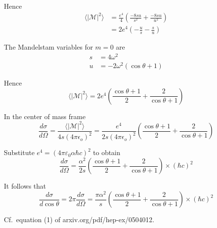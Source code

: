 Hence
\begin{align*}
\langle|\mathcal{M}|^2\rangle
&=\frac{e^4}{4}
\left(\frac{-8su}{s^2}+\frac{-8su}{u^2}\right)
\\
&=2e^4
\left(-\frac{u}{s}-\frac{s}{u}\right)
\end{align*}

The Mandelstam variables for $m=0$ are
\begin{align*}
s&=4\omega^2
\\
u&=-2\omega^2(\cos\theta+1)
\end{align*}

Hence
\begin{equation*}
\langle|\mathcal{M}|^2\rangle
=2e^4\left(
\frac{\cos\theta+1}{2}+\frac{2}{\cos\theta+1}
\right)
\end{equation*}

In the center of mass frame
\begin{equation*}
\frac{d\sigma}{d\Omega}=\frac{\langle|\mathcal{M}|^2\rangle}{4s(4\pi\epsilon_o)^2}
=\frac{e^4}{2s(4\pi\epsilon_o)^2}\left(\frac{\cos\theta+1}{2}+\frac{2}{\cos\theta+1}\right)
\end{equation*}

Substitute $e^4=(4\pi\varepsilon_0\alpha\hbar c)^2$ to obtain
\begin{equation*}
\frac{d\sigma}{d\Omega}=\frac{\alpha^2}{2s}
\left(\frac{\cos\theta+1}{2}+\frac{2}{\cos\theta+1}\right)\times(\hbar c)^2
\end{equation*}

It follows that
\begin{equation*}
\frac{d\sigma}{d\cos\theta}=2\pi\frac{d\sigma}{d\Omega}
=\frac{\pi\alpha^2}{s}
\left(\frac{\cos\theta+1}{2}+\frac{2}{\cos\theta+1}\right)\times(\hbar c)^2
\end{equation*}

Cf.~equation (1) of arxiv.org/pdf/hep-ex/0504012.


